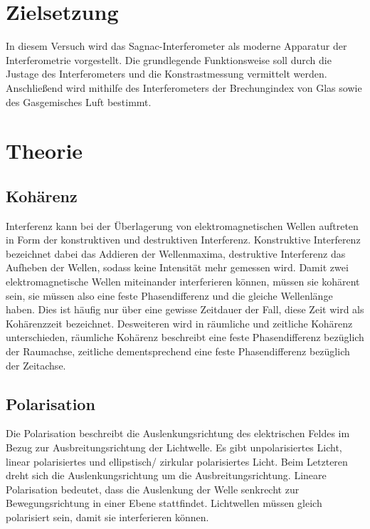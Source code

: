 \section{Zielsetzung}
\label{sec:Ziel} 
\noindent
In diesem Versuch wird das Sagnac-Interferometer als moderne Apparatur der Interferometrie vorgestellt. Die grundlegende Funktionsweise soll durch die Justage des Interferometers 
und die Konstrastmessung vermittelt werden. Anschließend wird mithilfe des Interferometers der Brechungindex von Glas sowie des Gasgemisches Luft bestimmt. 

\section{Theorie}
\label{sec:Theorie}


\subsection{Kohärenz}

\noindent Interferenz kann bei der Überlagerung von elektromagnetischen Wellen auftreten in Form der konstruktiven und destruktiven Interferenz. Konstruktive Interferenz bezeichnet dabei das
Addieren der Wellenmaxima, destruktive Interferenz das Aufheben der Wellen, sodass keine Intensität mehr gemessen wird. Damit zwei elektromagnetische Wellen miteinander interferieren können, 
müssen sie kohärent sein, sie müssen also eine feste Phasendifferenz und die gleiche Wellenlänge haben. Dies ist häufig nur über eine gewisse Zeitdauer der Fall, diese Zeit wird als 
Kohärenzzeit bezeichnet. Desweiteren wird in räumliche und zeitliche Kohärenz unterschieden, räumliche Kohärenz beschreibt eine feste Phasendifferenz bezüglich der Raumachse, zeitliche 
dementsprechend eine feste Phasendifferenz bezüglich der Zeitachse. 


\subsection{Polarisation}

\noindent Die Polarisation beschreibt die Auslenkungsrichtung des elektrischen Feldes im Bezug zur Ausbreitungsrichtung der Lichtwelle. Es gibt unpolarisiertes Licht, linear polarisiertes und ellipstisch/
zirkular polarisiertes Licht. Beim Letzteren dreht sich die Auslenkungsrichtung um die Ausbreitungsrichtung. Lineare Polarisation bedeutet, dass die Auslenkung der Welle senkrecht zur 
Bewegungsrichtung in einer Ebene stattfindet. Lichtwellen müssen gleich polarisiert sein, damit sie interferieren können. 


